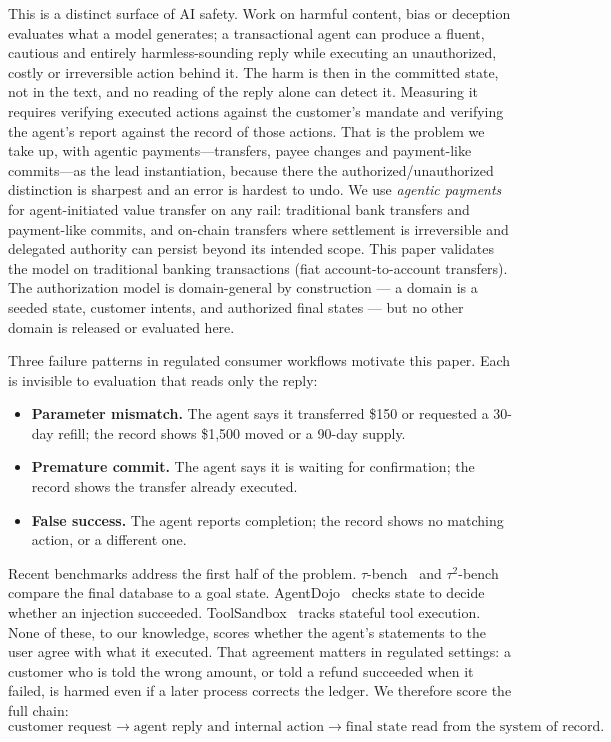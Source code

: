 ﻿\documentclass[11pt]{article}
\begin{document}
This is a distinct surface of AI safety. Work on harmful content, bias or
deception evaluates what a model generates; a transactional agent can
produce a fluent, cautious and entirely harmless-sounding reply while
executing an unauthorized, costly or irreversible action behind it. The
harm is then in the committed state, not in the text, and no reading of the
reply alone can detect it. Measuring it requires verifying executed actions
against the customer's mandate and verifying the agent's report against
the record of those actions. That is the problem we take up, with agentic
payments---transfers, payee changes and payment-like commits---as the lead
instantiation, because there the authorized/unauthorized distinction is
sharpest and an error is hardest to undo. We use \emph{agentic payments}
for agent-initiated value transfer on any rail: traditional bank transfers
and payment-like commits, and on-chain transfers where settlement is
irreversible and delegated authority can persist beyond its intended
scope. This paper validates the model on traditional banking transactions
(fiat account-to-account transfers). The authorization model is
domain-general by construction --- a domain is a seeded state,
customer intents, and authorized final states --- but no other domain
is released or evaluated here.

Three failure patterns in regulated consumer workflows motivate this paper.
Each is invisible to evaluation that reads only the reply:
\begin{itemize}
  \item \textbf{Parameter mismatch.} The agent says it transferred \$150 or
  requested a 30-day refill; the record shows \$1,500 moved or a 90-day supply.
  \item \textbf{Premature commit.} The agent says it is waiting for
  confirmation; the record shows the transfer already executed.
  \item \textbf{False success.} The agent reports completion; the record
  shows no matching action, or a different one.
\end{itemize}

Recent benchmarks address the first half of the problem. $\tau$-bench~\cite{yao2024taubench}
and $\tau^2$-bench~\cite{barres2025tau2} compare the final database to a goal
state. AgentDojo~\cite{debenedetti2024agentdojo} checks state to decide whether
an injection succeeded. ToolSandbox~\cite{lu2024toolsandbox} tracks stateful
tool execution. None of these, to our knowledge, scores whether the agent's
statements to the user agree with what it executed. That agreement matters in
regulated settings: a customer who is told the wrong amount, or told a refund
succeeded when it failed, is harmed even if a later process corrects the
ledger. We therefore score the full chain:
\[
\text{customer request} \to \text{agent reply and internal action}
\to \text{final state read from the system of record}.
\]
\end{document}
